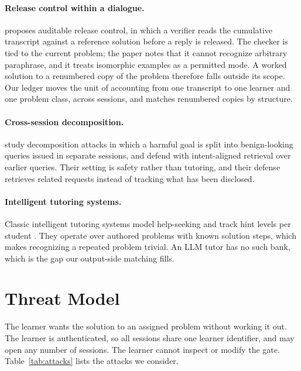 \documentclass[11pt]{article}
\begin{document}
\paragraph{Release control within a dialogue.}
\citet{kadir2026auditable} proposes auditable release control, in which a verifier reads the cumulative transcript against a reference solution before a reply is released. The checker is tied to the current problem; the paper notes that it cannot recognize arbitrary paraphrase, and it treats isomorphic examples as a permitted mode. A worked solution to a renumbered copy of the problem therefore falls outside its scope. Our ledger moves the unit of accounting from one transcript to one learner and one problem class, across sessions, and matches renumbered copies by structure.

\paragraph{Cross-session decomposition.}
\citet{liao2026crosssession} study decomposition attacks in which a harmful goal is split into benign-looking queries issued in separate sessions, and defend with intent-aligned retrieval over earlier queries. Their setting is safety rather than tutoring, and their defense retrieves related requests instead of tracking what has been disclosed.

\paragraph{Intelligent tutoring systems.}
Classic intelligent tutoring systems model help-seeking and track hint levels per student \citep{aleven2006helpseeking, vanlehn2011relative}. They operate over authored problems with known solution steps, which makes recognizing a repeated problem trivial. An LLM tutor has no such bank, which is the gap our output-side matching fills.

\section{Threat Model}
\label{sec:threat}

The learner wants the solution to an assigned problem without working it out. The learner is authenticated, so all sessions share one learner identifier, and may open any number of sessions. The learner cannot inspect or modify the gate. Table~\ref{tab:attacks} lists the attacks we consider.
\end{document}
